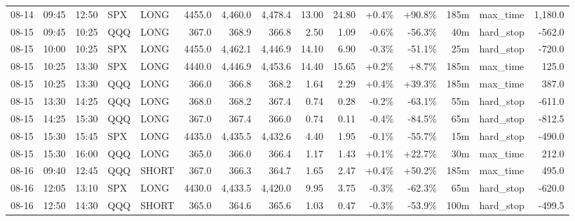 \documentclass[11pt,a4paper,twoside]{article}
\begin{document}
\begin{landscape}
\begin{center}
\begin{longtable}{>{\color{txtmain}}l l l l l r r r r r r r r >{\color{txtmain}}l r}
08-14 & 09:45 & 12:50 & SPX & LONG & 4455.0 & 4,460.0 & 4,478.4 & 13.00 & 24.80 & \textcolor{wingreen}{+0.4\%} & \textcolor{wingreen}{+90.8\%} & 185m & max\_time & \textcolor{wingreen}{1,180.0} \\
08-15 & 09:45 & 10:25 & QQQ & LONG & 367.0 & 368.9 & 366.8 & 2.50 & 1.09 & \textcolor{lossred}{-0.6\%} & \textcolor{lossred}{-56.3\%} & 40m & hard\_stop & \textcolor{lossred}{-562.0} \\
08-15 & 10:00 & 10:25 & SPX & LONG & 4455.0 & 4,462.1 & 4,446.9 & 14.10 & 6.90 & \textcolor{lossred}{-0.3\%} & \textcolor{lossred}{-51.1\%} & 25m & hard\_stop & \textcolor{lossred}{-720.0} \\
08-15 & 10:25 & 13:30 & SPX & LONG & 4440.0 & 4,446.9 & 4,453.6 & 14.40 & 15.65 & \textcolor{wingreen}{+0.2\%} & \textcolor{wingreen}{+8.7\%} & 185m & max\_time & \textcolor{wingreen}{125.0} \\
08-15 & 10:25 & 13:30 & QQQ & LONG & 366.0 & 366.8 & 368.2 & 1.64 & 2.29 & \textcolor{wingreen}{+0.4\%} & \textcolor{wingreen}{+39.3\%} & 185m & max\_time & \textcolor{wingreen}{387.0} \\
08-15 & 13:30 & 14:25 & QQQ & LONG & 368.0 & 368.2 & 367.4 & 0.74 & 0.28 & \textcolor{lossred}{-0.2\%} & \textcolor{lossred}{-63.1\%} & 55m & hard\_stop & \textcolor{lossred}{-611.0} \\
08-15 & 14:25 & 15:30 & QQQ & LONG & 367.0 & 367.4 & 366.0 & 0.74 & 0.11 & \textcolor{lossred}{-0.4\%} & \textcolor{lossred}{-84.5\%} & 65m & hard\_stop & \textcolor{lossred}{-812.5} \\
08-15 & 15:30 & 15:45 & SPX & LONG & 4435.0 & 4,435.5 & 4,432.6 & 4.40 & 1.95 & \textcolor{lossred}{-0.1\%} & \textcolor{lossred}{-55.7\%} & 15m & hard\_stop & \textcolor{lossred}{-490.0} \\
08-15 & 15:30 & 16:00 & QQQ & LONG & 365.0 & 366.0 & 366.4 & 1.17 & 1.43 & \textcolor{wingreen}{+0.1\%} & \textcolor{wingreen}{+22.7\%} & 30m & max\_time & \textcolor{wingreen}{212.0} \\
08-16 & 09:40 & 12:45 & QQQ & SHORT & 367.0 & 366.3 & 364.7 & 1.65 & 2.47 & \textcolor{wingreen}{+0.4\%} & \textcolor{wingreen}{+50.2\%} & 185m & max\_time & \textcolor{wingreen}{495.0} \\
08-16 & 12:05 & 13:10 & SPX & LONG & 4430.0 & 4,433.5 & 4,420.0 & 9.95 & 3.75 & \textcolor{lossred}{-0.3\%} & \textcolor{lossred}{-62.3\%} & 65m & hard\_stop & \textcolor{lossred}{-620.0} \\
08-16 & 12:50 & 14:30 & QQQ & SHORT & 365.0 & 364.6 & 365.6 & 1.03 & 0.47 & \textcolor{lossred}{-0.3\%} & \textcolor{lossred}{-53.9\%} & 100m & hard\_stop & \textcolor{lossred}{-499.5} \\

\end{longtable}
\end{center}
\end{landscape}
\end{document}
